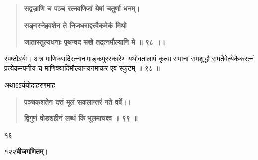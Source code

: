 \documentclass[11pt, openany]{book}
\begin{document}
\begin{sloppypar}
\begin{quote}
\hspace{1in}\textbf{सद्वज्राणि च पञ्च रत्नवणिजां येषां चतुर्णा धनम्।}

\hspace{1in}\textbf{सङ्गस्नेहवशेन ते निजधनाद्दत्त्वैकमेकं मिथो}

\hspace{1in}\textbf{जातास्तुल्यधनाः पृथग्वद सखे तद्रत्नमौल्यानि मे ॥ ९८ ।।}
\end{quote}

\hangindent=0.2in \hspace{0.2in}स्पष्टोऽर्थः। अत्र माणिक्यादिरत्नानामाङ्कपुरस्कारेण यथोक्तालापं कृत्वा समानां समशुद्धौ समतैवेत्येकैकरत्नं प्रत्येकमपनीय च माणिक्यादिमौल्यानयनमाकर एव स्फुटम् ॥ ९८ ॥

\hangindent=0.2in \hspace{0.2in}अथाऽऽर्ययोदाहरणमाह\textendash

\begin{quote}
\hspace{1in}\textbf{पञ्चकशतेन दत्तं मूलं सकलान्तरं गते वर्षे।।}

\hspace{1in}\textbf{द्विगुणं षोडशहीनं लब्धं किं भूलमाचक्ष्व ॥ ९९ ॥}
\end{quote}
\hangindent=0.2in \hspace{0.4in}१६
\end{sloppypar}
\thispagestyle{empty}
\newpage

\onehalfspacing
१२२\hspace{2in}\textbf{बीजगणितम्।} 

\vspace{5mm}
\end{document}
